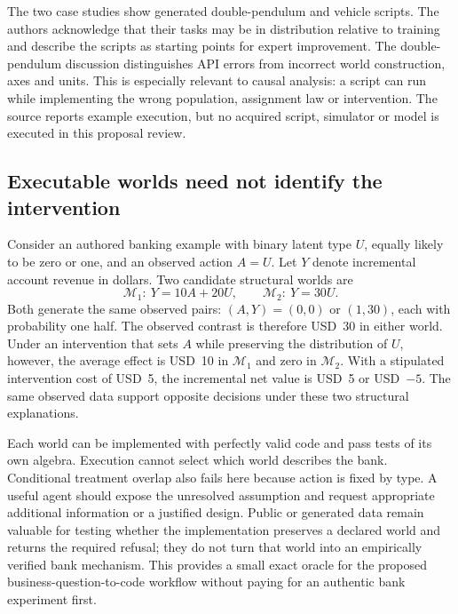 The two case studies show generated double-pendulum and vehicle scripts.
The authors acknowledge that their tasks may be in distribution relative to
training and describe the scripts as starting points for expert improvement.
The double-pendulum discussion distinguishes API errors from incorrect world
construction, axes and units. This is especially relevant to causal analysis:
a script can run while implementing the wrong population, assignment law or
intervention. The source reports example execution, but no acquired script,
simulator or model is executed in this proposal review.
\citep{exec24_chronollm_original}

\subsection{Executable worlds need not identify the intervention}
Consider an authored banking example with binary latent type $U$, equally
likely to be zero or one, and an observed action $A=U$. Let $Y$ denote
incremental account revenue in dollars. Two candidate structural worlds are
\begin{equation}
  \mathcal M_1:\ Y=10A+20U,
  \qquad
  \mathcal M_2:\ Y=30U.
  \label{eq:exec24-chronollm-worlds}
\end{equation}
Both generate the same observed pairs: $(A,Y)=(0,0)$ or $(1,30)$, each with
probability one half. The observed contrast is therefore USD~30 in either
world. Under an intervention that sets $A$ while preserving the distribution
of $U$, however, the average effect is USD~10 in $\mathcal M_1$ and zero in
$\mathcal M_2$. With a stipulated intervention cost of USD~5, the incremental
net value is USD~5 or USD~$-5$. The same observed data support opposite
decisions under these two structural explanations.
\citep{exec24_chronollm_reference}

Each world can be implemented with perfectly valid code and pass tests of its
own algebra. Execution cannot select which world describes the bank.
Conditional treatment overlap also fails here because action is fixed by
type. A useful agent should expose the unresolved assumption and request
appropriate additional information or a justified design. Public or generated
data remain valuable for testing whether the implementation preserves a
declared world and returns the required refusal; they do not turn that world
into an empirically verified bank mechanism. This provides a small exact
oracle for the proposed business-question-to-code workflow without paying
for an authentic bank experiment first.

